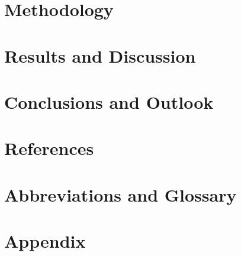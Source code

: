 %

\section{Methodology}
\label{sec:method}


\section{Results and Discussion}


%

\section{Conclusions and Outlook}


\clearpage
\section{References}
\printbibliography[heading=none]

\clearpage
\section*{Abbreviations and Glossary}
\printglossaries

\clearpage
\section{Appendix}
\label{sec:appendix}


